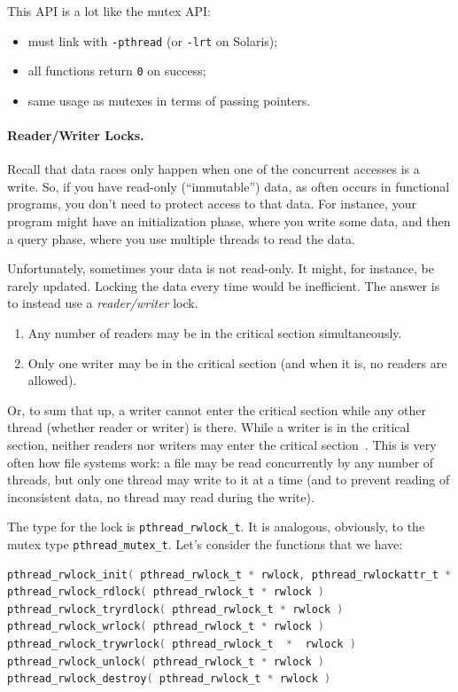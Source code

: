 \documentclass[a4paper]{report}
\begin{document}
This API is a lot like the mutex API:
  \begin{itemize}
    \item must link with {\tt -pthread} (or {\tt -lrt} on Solaris);
    \item all functions return {\tt 0} on success;
    \item same usage as mutexes in terms of passing pointers.
  \end{itemize}


\paragraph{Reader/Writer Locks.} Recall that data races only happen when
one of the concurrent accesses is a write. So, if you have read-only
(``immutable'') data, as often occurs in functional programs, you don't need
to protect access to that data. For instance, your program might
have an initialization phase, where you write some data, and then a 
query phase, where you use multiple threads to read the data.

Unfortunately, sometimes your data is not read-only. It might, for instance,
be rarely updated. Locking the data every time would be inefficient.
The answer is to instead use a \emph{reader/writer} lock.

\begin{enumerate}
\item Any number of readers may be in the critical section simultaneously.
\item Only one writer may be in the critical section (and when it is, no readers are allowed).
\end{enumerate}

Or, to sum that up, a writer cannot enter the critical section while any other thread (whether reader or writer) is there. While a writer is in the critical section, neither readers nor writers may enter the critical section~\cite{lbs}. This is very often how file systems work: a file may be read concurrently by any number of threads, but only one thread may write to it at a time (and to prevent reading of inconsistent data, no thread may read during the write).


The type for the lock is \texttt{pthread\_rwlock\_t}. It is analogous, obviously, to the mutex type \texttt{pthread\_mutex\_t}. Let's consider the functions that we have:

\begin{lstlisting}[language=C]
pthread_rwlock_init( pthread_rwlock_t * rwlock, pthread_rwlockattr_t * attr )
pthread_rwlock_rdlock( pthread_rwlock_t * rwlock )
pthread_rwlock_tryrdlock( pthread_rwlock_t * rwlock )
pthread_rwlock_wrlock( pthread_rwlock_t * rwlock )
pthread_rwlock_trywrlock( pthread_rwlock_t  *  rwlock )
pthread_rwlock_unlock( pthread_rwlock_t * rwlock )
pthread_rwlock_destroy( pthread_rwlock_t * rwlock )
\end{lstlisting}
\end{document}

